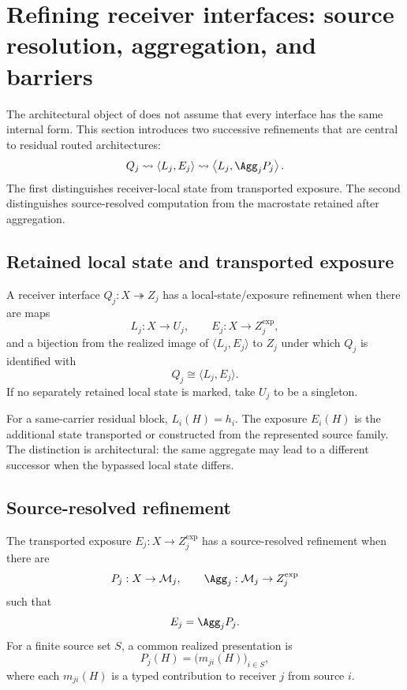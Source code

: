 \section{Refining receiver interfaces: source resolution, aggregation, and barriers}\label{sec:interface-refinement}

The architectural object of  does not assume that every interface has the same internal form. This section introduces two successive refinements that are central to residual routed architectures:
\[
Q_j
\rightsquigarrow
\langle L_j,E_j\rangle
\rightsquigarrow
\left\langle L_j,\Agg_jP_j\right\rangle.
\]
The first distinguishes receiver-local state from transported exposure. The second distinguishes source-resolved computation from the macrostate retained after aggregation.

\subsection{Retained local state and transported exposure}

\begin{definition}\label{def:local-exposure-refinement}
A receiver interface $Q_j:X\twoheadrightarrow Z_j$ has a local-state/exposure refinement when there are maps
\[
L_j:X\to U_j,
\qquad
E_j:X\to Z_j^{\mathrm{exp}},
\]
and a bijection from the realized image of $\langle L_j,E_j\rangle$ to $Z_j$ under which $Q_j$ is identified with
\[
Q_j\cong\langle L_j,E_j\rangle.
\]
If no separately retained local state is marked, take $U_j$ to be a singleton.
\end{definition}

For a same-carrier residual block, $L_i(H)=h_i$. The exposure $E_i(H)$ is the additional state transported or constructed from the represented source family. The distinction is architectural: the same aggregate may lead to a different successor when the bypassed local state differs.

\subsection{Source-resolved refinement}

\begin{definition}\label{def:source-resolved-refinement}
The transported exposure $E_j:X\to Z_j^{\mathrm{exp}}$ has a source-resolved refinement when there are
\[
P_j:X\to\mathcal M_j,
\qquad
\Agg_j:\mathcal M_j\to Z_j^{\mathrm{exp}}
\]
such that
\[
E_j=\Agg_jP_j.
\]
For a finite source set $S$, a common realized presentation is
\[
P_j(H)=\bigl(m_{ji}(H)\bigr)_{i\in S},
\]
where each $m_{ji}(H)$ is a typed contribution to receiver $j$ from source $i$.
\end{definition}

